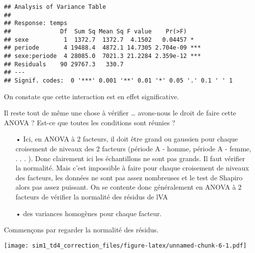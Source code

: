 \documentclass[
]{article}
\newenvironment{Shaded}{\begin{snugshade}}{\end{snugshade}}
\newcommand{\FunctionTok}[1]{\textcolor[rgb]{0.00,0.00,0.00}{#1}}
\newcommand{\NormalTok}[1]{#1}
\newcommand{\SpecialCharTok}[1]{\textcolor[rgb]{0.00,0.00,0.00}{#1}}
\begin{document}
\begin{verbatim}
## Analysis of Variance Table
## 
## Response: temps
##              Df  Sum Sq Mean Sq F value    Pr(>F)    
## sexe          1  1372.7  1372.7  4.1502   0.04457 *  
## periode       4 19488.4  4872.1 14.7305 2.704e-09 ***
## sexe:periode  4 28085.0  7021.3 21.2284 2.359e-12 ***
## Residuals    90 29767.3   330.7                      
## ---
## Signif. codes:  0 '***' 0.001 '**' 0.01 '*' 0.05 '.' 0.1 ' ' 1
\end{verbatim}

On constate que cette interaction est en effet significative.

Il reste tout de même une chose à vérifier \ldots{} avons-nous le droit
de faire cette ANOVA ? Est-ce que toutes les conditions sont réunies ?\\

\begin{itemize}
\item[•] Ici, en ANOVA à 2 facteurs, il doit être grand ou gaussien pour chaque croisement de niveaux des 2 facteurs (période A - homme, période A - femme, . . . ). Donc clairement ici les échantillons ne sont pas grands. Il faut vérifier la normalité. Mais c’est impossible à faire pour chaque croisement de niveaux des facteurs, les données ne sont pas assez nombreuses et le test de Shapiro alors pas assez puissant. On se contente donc généralement en ANOVA à 2 facteurs de vérifier la normalité des résidus de
lVA\item[•] des variances homogènes pour chaque facteur.
\end{itemize}

Commençons par regarder la normalité des résidus.

\begin{Shaded}
\end{Shaded}

\texttt{[image: sim1\_td4\_correction\_files/figure-latex/unnamed-chunk-6-1.pdf]}

\begin{Shaded}
\end{Shaded}
\end{document}
